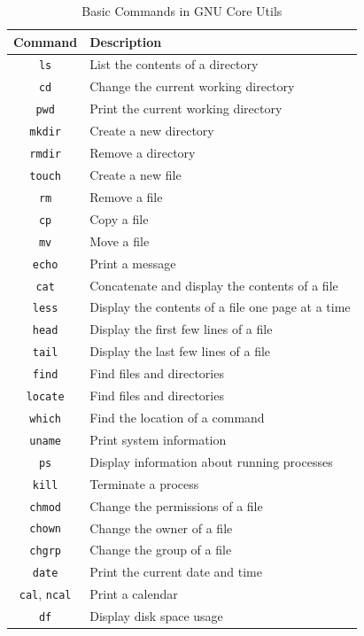 \begin{table}[h!]
\caption{Basic Commands in GNU Core Utils}
\begin{tabular}{ c l }
  \toprule
 Command & Description \\
 \midrule
  \lstinline|ls| & List the contents of a directory \\
  \lstinline|cd| & Change the current working directory \\
  \lstinline|pwd| & Print the current working directory \\
  \lstinline|mkdir| & Create a new directory \\
  \lstinline|rmdir| & Remove a directory \\
  \lstinline|touch| & Create a new file \\
  \lstinline|rm| & Remove a file \\
  \lstinline|cp| & Copy a file \\
  \lstinline|mv| & Move a file \\
  \lstinline|echo| & Print a message \\
  \lstinline|cat| & Concatenate and display the contents of a file \\
  \lstinline|less| & Display the contents of a file one page at a time \\
  \lstinline|head| & Display the first few lines of a file \\
  \lstinline|tail| & Display the last few lines of a file \\
  \lstinline|find| & Find files and directories \\
  \lstinline|locate| & Find files and directories \\
  \lstinline|which| & Find the location of a command \\
  \lstinline|uname| & Print system information \\
  \lstinline|ps| & Display information about running processes \\
  \lstinline|kill| & Terminate a process \\
  \lstinline|chmod| & Change the permissions of a file \\
  \lstinline|chown| & Change the owner of a file \\
  \lstinline|chgrp| & Change the group of a file \\
  \lstinline|date| & Print the current date and time \\
  \lstinline|cal|, \lstinline|ncal| & Print a calendar \\
  \lstinline|df| & Display disk space usage \\

\end{tabular}
\end{table}
